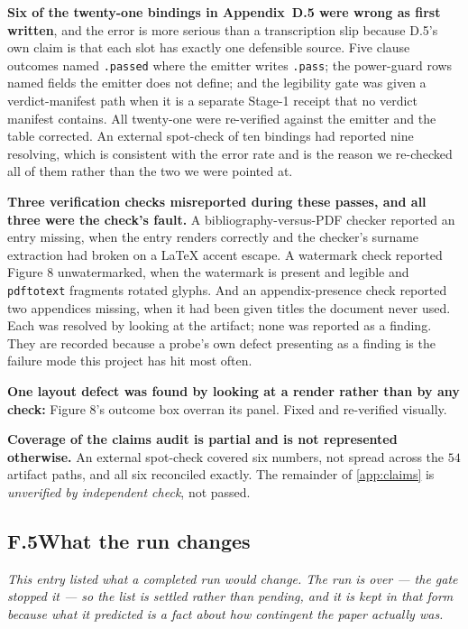 \textbf{Six of the twenty-one bindings in Appendix~D.5 were wrong as first written}, and
the error is more serious than a transcription slip because D.5's own claim is that each slot has
exactly one defensible source. Five clause outcomes named \texttt{.passed} where the emitter writes
\texttt{.pass}; the power-guard rows named fields the emitter does not define; and the legibility
gate was given a verdict-manifest path when it is a separate Stage-1 receipt that no verdict
manifest contains. All twenty-one were re-verified against the emitter and the table corrected. An
external spot-check of ten bindings had reported nine resolving, which is consistent with the error
rate and is the reason we re-checked all of them rather than the two we were pointed at.

\textbf{Three verification checks misreported during these passes, and all three were the check's
fault.} A bibliography-versus-PDF checker reported an entry missing, when the entry renders
correctly and the checker's surname extraction had broken on a \LaTeX{} accent escape. A watermark
check reported Figure 8 unwatermarked, when the watermark is present and legible and
\texttt{pdftotext} fragments rotated glyphs. And an appendix-presence check reported two appendices
missing, when it had been given titles the document never used. Each was resolved by looking at the
artifact; none was reported as a finding. They are recorded because a probe's own defect presenting
as a finding is the failure mode this project has hit most often.

\textbf{One layout defect was found by looking at a render rather than by any check:} Figure 8's
outcome box overran its panel. Fixed and re-verified visually.

\textbf{Coverage of the claims audit is partial and is not represented otherwise.} An external
spot-check covered six numbers, not spread across the $54$ artifact paths, and all six reconciled
exactly. The remainder of \cref{app:claims} is \emph{unverified by independent check}, not passed.

\subsection*{F.5\quad What the run changes}

\emph{This entry listed what a completed run would change. The run is over --- the gate stopped it
--- so the list is settled rather than pending, and it is kept in that form because what it
predicted is a fact about how contingent the paper actually was.}

